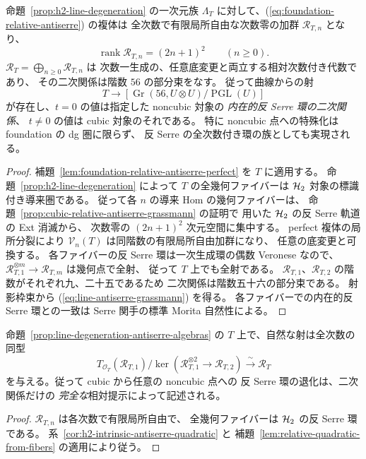 \begin{proposition}
\label{prop:line-degeneration-antiserre-algebras}
命題~\ref{prop:h2-line-degeneration} の一次元族
$\Lambda_T$ に対して、(\ref{eq:foundation-relative-antiserre}) の複体は
全次数で有限局所自由な次数零の加群 $\mathscr R_{T,n}$ となり、
\[
 \operatorname{rank}\mathscr R_{T,n}=(2n+1)^2
 \qquad(n\ge0).
\]
$\mathscr R_T=\bigoplus_{n\ge0}\mathscr R_{T,n}$ は
次数一生成の、任意底変更と両立する相対次数付き代数であり、
その二次関係は階数 $56$ の部分束をなす。
従って曲線からの射
\[
 T\longrightarrow
 \left[\operatorname{Gr}(56,U\otimes U)/\operatorname{PGL}(U)\right]
 \tag{D-Gr}\label{eq:line-antiserre-grassmann}
\]
が存在し、$t=0$ の値は指定した noncubic 対象の
\emph{内在的反 Serre 環の二次関係}、
$t\ne0$ の値は cubic 対象のそれである。
特に noncubic 点への特殊化は foundation の dg 圏に限らず、
反 Serre の全次数付き環の族としても実現される。
\end{proposition}
\begin{proof}
補題~\ref{lem:foundation-relative-antiserre-perfect} を $T$ に適用する。
命題~\ref{prop:h2-line-degeneration} によって
$T$ の全幾何ファイバーは $\mathcal H_2$ 対象の標識付き導来圏である。
従って各 $n$ の導来 Hom の幾何ファイバーは、
命題~\ref{prop:cubic-relative-antiserre-grassmann} の証明で
用いた $\mathcal H_2$ の反 Serre 軌道の Ext 消滅から、
次数零の $(2n+1)^2$ 次元空間に集中する。
perfect 複体の局所分裂により
$\mathscr V_n(T)$ は同階数の有限局所自由加群になり、
任意の底変更と可換する。
各ファイバーの反 Serre 環は一次生成環の偶数 Veronese なので、
$\mathscr R_{T,1}^{\otimes m}\to\mathscr R_{T,m}$ は幾何点で全射、
従って $T$ 上でも全射である。
$\mathscr R_{T,1}$、$\mathscr R_{T,2}$ の階数がそれぞれ九、二十五であるため
二次関係は階数五十六の部分束である。
射影枠束から (\ref{eq:line-antiserre-grassmann}) を得る。
各ファイバーでの内在的反 Serre 環との一致は
Serre 関手の標準 Morita 自然性による。
\end{proof}

\begin{corollary}
\label{cor:line-full-quadratic-degeneration}
命題~\ref{prop:line-degeneration-antiserre-algebras} の
$T$ 上で、自然な射は全次数の同型
\[
 T_{\mathcal O_T}(\mathscr R_{T,1})/
 \ker(\mathscr R_{T,1}^{\otimes2}\to\mathscr R_{T,2})
   \xrightarrow{\ \sim\ }\mathscr R_T
 \tag{D-quad}\label{eq:line-full-quadratic}
\]
を与える。従って cubic から任意の noncubic 点への
反 Serre 環の退化は、二次関係だけの
\emph{完全な}相対提示によって記述される。
\end{corollary}
\begin{proof}
$\mathscr R_{T,n}$ は各次数で有限局所自由で、
全幾何ファイバーは $\mathcal H_2$ の反 Serre 環である。
系~\ref{cor:h2-intrinsic-antiserre-quadratic} と
補題~\ref{lem:relative-quadratic-from-fibers} の適用により従う。
\end{proof}

